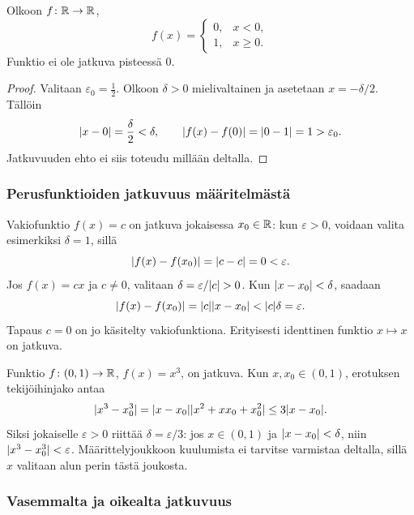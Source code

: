 \documentclass[11pt,a4paper]{amsart}
\begin{document}
\begin{example}[Hyppyfunktio]
  Olkoon $f\colon\mathbb{R}\to\mathbb{R}$,
  \[
    f(x)=
    \begin{cases}0,&x<0,\\1,&x\ge0.
    \end{cases}
  \]
  Funktio ei ole jatkuva pisteessä $0$.
\end{example}
\begin{proof}
  Valitaan $\varepsilon_0=\frac12$. Olkoon $\delta>0$ mielivaltainen
  ja asetetaan $x=-\delta/2$. Tällöin
  \[
    \lvert x-0\rvert=\frac{\delta}{2}<\delta,
    \qquad \lvert f(x)-f(0)\rvert=\lvert0-1\rvert=1>\varepsilon_0.
  \]
  Jatkuvuuden ehto ei siis toteudu millään deltalla.
\end{proof}

\subsubsection*{Perusfunktioiden jatkuvuus määritelmästä}

\begin{example}
  Vakiofunktio $f(x)=c$ on jatkuva jokaisessa $x_0\in\mathbb{R}$:
  kun $\varepsilon>0$, voidaan valita esimerkiksi $\delta=1$, sillä
  \[
    \lvert f(x)-f(x_0)\rvert=\lvert c-c\rvert=0<\varepsilon.
  \]
  Jos $f(x)=cx$ ja $c\ne0$, valitaan
  $\delta=\varepsilon/\lvert c\rvert>0$. Kun $\lvert x-x_0\rvert<\delta$, saadaan
  \[
    \lvert f(x)-f(x_0)\rvert=\lvert c\rvert\lvert x-x_0\rvert
    <\lvert c\rvert\delta=\varepsilon.
  \]
  Tapaus $c=0$ on jo käsitelty vakiofunktiona. Erityisesti
  identtinen funktio $x\mapsto x$ on jatkuva.
\end{example}

\begin{example}
  Funktio $f\colon(0,1)\to\mathbb{R}$, $f(x)=x^3$, on jatkuva.
  Kun $x,x_0\in(0,1)$, erotuksen tekijöihinjako antaa
  \[
    \lvert x^3-x_0^3\rvert
    =\lvert x-x_0\rvert\lvert x^2+xx_0+x_0^2\rvert
    \le3\lvert x-x_0\rvert.
  \]
  Siksi jokaiselle $\varepsilon>0$ riittää
  $\delta=\varepsilon/3$: jos $x\in(0,1)$ ja
  $\lvert x-x_0\rvert<\delta$, niin $\lvert x^3-x_0^3\rvert<\varepsilon$.
  Määrittelyjoukkoon kuulumista ei tarvitse varmistaa deltalla,
  sillä $x$ valitaan alun perin tästä joukosta.
\end{example}

\newpage
\subsubsection*{Vasemmalta ja oikealta jatkuvuus}
\end{document}
